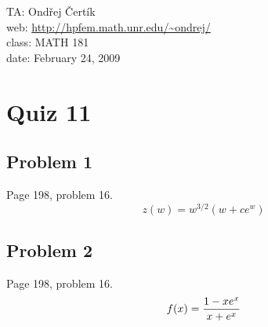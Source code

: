 \documentclass[10pt]{article}
\begin{document}
\noindent TA: Ondřej Čertík\\
web: \url{http://hpfem.math.unr.edu/~ondrej/}\\
class: MATH 181\\
date: February 24, 2009

\section*{Quiz 11}

\subsection*{Problem 1}

Page 198, problem 16.
$$z(w) =   w ^ {3/2} (w + c e^w)$$

\subsection*{Problem 2}

Page 198, problem 16.
$$f(x) = {1-xe^x\over x+e^x}$$
\end{document}
